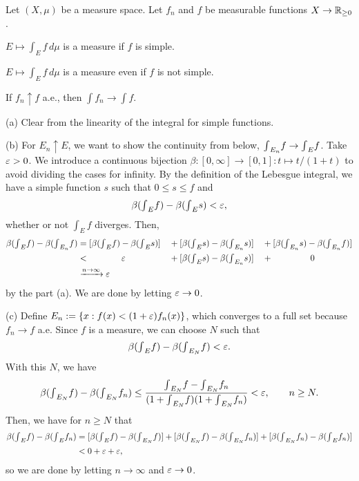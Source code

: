 \documentclass{../../large}
\begin{document}
\begin{prb}
Let $(X,\mu)$ be a measure space.
Let $f_n$ and $f$ be measurable functions $X\to\mathbb{R}_{\ge0}$.
\begin{parts}
\item $E\mapsto\int_Ef\,d\mu$ is a measure if $f$ is simple.
\item $E\mapsto\int_Ef\,d\mu$ is a measure even if $f$ is not simple.
\item If $f_n\uparrow f$ a.e., then $\int f_n\to\int f$.
\end{parts}
\end{prb}
\begin{pf}
(a)
Clear from the linearity of the integral for simple functions.

(b)
For $E_n\uparrow E$, we want to show the continuity from below, ${\textstyle\int}_{E_n}f\to{\textstyle\int}_Ef$.
Take $\varepsilon>0$.
We introduce a continuous bijection $\beta:[0,\infty]\to[0,1]:t\mapsto t/(1+t)$ to avoid dividing the cases for infinity.
By the definition of the Lebesgue integral, we have a simple function $s$ such that $0\le s\le f$ and
\[\beta({\textstyle\int}_Ef)-\beta({\textstyle\int}_Es)<\varepsilon,\]
whether or not $\int_Ef$ diverges.
Then,
\begin{alignat*}{4}
\beta(\tint_Ef)-\beta(\tint_{E_n}f)
&=[\beta(\tint_Ef)-\beta(\tint_Es)]
&&+[\beta(\tint_Es)-\beta(\tint_{E_n}s)]
&&+[\beta(\tint_{E_n}s)-\beta(\tint_{E_n}f)]\\
&\ccol{<}{\e}
&&+[\beta(\tint_Es)-\beta(\tint_{E_n}s)]
&&\ccol{+}{0}\\
&\xrightarrow{n\to\infty}\e
\end{alignat*}
by the part (a).
We are done by letting $\varepsilon\to0$.

(c)
Define $E_n:=\{x:f(x)<(1+\varepsilon)f_n(x)\}$,
which converges to a full set because $f_n\to f$ a.e.
Since $f$ is a measure, we can choose $N$ such that
\[\beta({\textstyle\int}_Ef)-\beta({\textstyle\int}_{E_N}f)<\varepsilon.\]
With this $N$, we have
\[\beta({\textstyle\int}_{E_N}f)-\beta({\textstyle\int}_{E_N}f_n)\le\frac{{\textstyle\int}_{E_N}f-{\textstyle\int}_{E_N}f_n}{(1+{\textstyle\int}_{E_N}f)(1+{\textstyle\int}_{E_N}f_n)}<\varepsilon,\qquad n\ge N.\]
Then, we have for $n\ge N$ that
\begin{align*}
\beta({\textstyle\int}_Ef)-\beta({\textstyle\int}_Ef_n)
&=[\beta({\textstyle\int}_Ef)-\beta({\textstyle\int}_{E_N}f)]+[\beta({\textstyle\int}_{E_N}f)-\beta({\textstyle\int}_{E_N}f_n)]+[\beta({\textstyle\int}_{E_N}f_n)-\beta({\textstyle\int}_{E}f_n)]\\
&<0+\varepsilon+\varepsilon,
\end{align*}
so we are done by letting $n\to\infty$ and $\varepsilon\to0$.
\end{pf}
\end{document}
